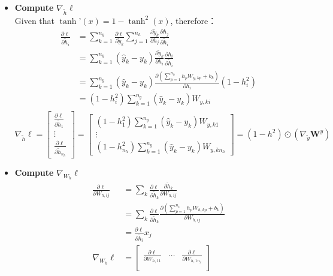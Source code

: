 \documentclass{article}
\begin{document}
\begin{itemize}
    \item \textbf{Compute} \(\nabla_{\tilde{h}} \ell\)\\
    Given that \(\tanh’(x) = 1 - \tanh^2(x)\), therefore：
    \begin{align*}
        \frac{\partial \ell}{\partial \tilde{h}_i}
        &= \sum_{k=1}^{n_y} \frac{\partial\ell}{\partial \tilde{y}_k} 
        \sum_{j=1}^{n_h} \frac{\partial \tilde{y}_k}{\partial h_j}
        \frac{\partial h_j}{\partial \tilde{h}_i}\\
        &= \sum_{k=1}^{n_y} (\hat{y}_k-y_k) 
        \frac{\partial \tilde{y}_k}{\partial h_i}
        \frac{\partial h_i}{\partial \tilde{h}_i}\\
        &= \sum_{k=1}^{n_y} (\hat{y}_k-y_k)
        \frac{\partial (\sum_{p=1}^{n_h} h_p W_{y,kp}+b_k)}{\partial h_i} (1-h_i^2)\\
        &= (1-h_i^2)\sum_{k=1}^{n_y} (\hat{y}_k-y_k)
        W_{y,ki}\\
    \end{align*}
\[
\nabla_{\tilde{h}}\ell
 =\begin{bmatrix} 
\frac{\partial \ell}{\partial \tilde{h}_1} \\
\vdots \\
\frac{\partial \ell}{\partial \tilde{h}_{n_h}} 
\end{bmatrix}
=\begin{bmatrix} 
 (1-h_1^2)\sum_{k=1}^{n_y} (\hat{y}_k-y_k)W_{y,k1}\\
\vdots \\
(1-h_{n_h}^2)\sum_{k=1}^{n_y} (\hat{y}_k-y_k)W_{y,kn_h}
\end{bmatrix}
=(1-h^2) \odot (\nabla_{\tilde{y}} \mathbf{W}^y)
\]
    \item \textbf{Compute }\(\nabla_{W_h} \ell\)
    \begin{align*}
    \frac{\partial \ell}{\partial W_{h,ij}}
    &= \sum_k \frac{\partial \ell}{\partial \tilde{h}_k} \frac{\partial \tilde{h}_k}{\partial W_{h,ij}}\\
   & = \sum_k \frac{\partial \ell}{\partial \tilde{h}_k} \frac{\partial (\sum_{p=1}^{n_x} h_p W_{h,kp}+b_k)}{\partial W_{h,ij}}\\
    &=\frac{\partial \ell}{\partial \tilde{h}_i} x_j\\
    \nabla_{W_h} \ell
    &=\begin{bmatrix} 
\frac{\partial \ell}{\partial W_{h,11}} & \cdots & \frac{\partial \ell}{\partial W_{h,1n_x}} \\

\end{bmatrix}
\end{align*}
\end{itemize}
\end{document}
